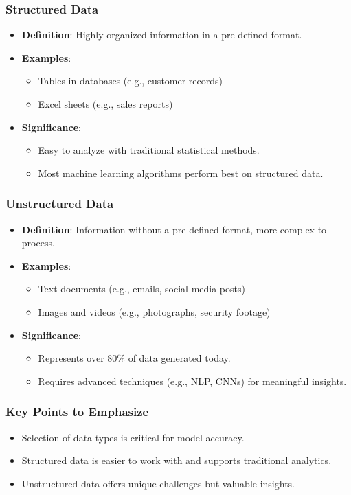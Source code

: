 \documentclass[aspectratio=169]{beamer}
\begin{document}
\begin{frame}[fragile]
    \frametitle{Structured Data}
    \begin{itemize}
        \item \textbf{Definition}: Highly organized information in a pre-defined format.
        \item \textbf{Examples}:
        \begin{itemize}
            \item Tables in databases (e.g., customer records)
            \item Excel sheets (e.g., sales reports)
        \end{itemize}
        \item \textbf{Significance}:
        \begin{itemize}
            \item Easy to analyze with traditional statistical methods.
            \item Most machine learning algorithms perform best on structured data.
        \end{itemize}
    \end{itemize}
\end{frame}

\begin{frame}[fragile]
    \frametitle{Unstructured Data}
    \begin{itemize}
        \item \textbf{Definition}: Information without a pre-defined format, more complex to process.
        \item \textbf{Examples}:
        \begin{itemize}
            \item Text documents (e.g., emails, social media posts)
            \item Images and videos (e.g., photographs, security footage)
        \end{itemize}
        \item \textbf{Significance}:
        \begin{itemize}
            \item Represents over 80\% of data generated today.
            \item Requires advanced techniques (e.g., NLP, CNNs) for meaningful insights.
        \end{itemize}
    \end{itemize}
\end{frame}

\begin{frame}[fragile]
    \frametitle{Key Points to Emphasize}
    \begin{itemize}
        \item Selection of data types is critical for model accuracy.
        \item Structured data is easier to work with and supports traditional analytics.
        \item Unstructured data offers unique challenges but valuable insights.
    \end{itemize}
\end{frame}
\end{document}
